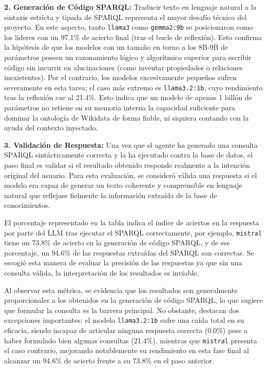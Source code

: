 \textbf{2. Generación de Código SPARQL:} Traducir texto en lenguaje natural a la sintaxis estricta y tipada de SPARQL representa el mayor desafío técnico del proyecto. En este aspecto, tanto \texttt{llama3} como \texttt{gemma2:9b} se posicionaron como los líderes con un 97.1\% de acierto final (tras el bucle de reflexión). Esto confirma la hipótesis de que los modelos con un tamaño en torno a los 8B-9B de parámetros poseen un razonamiento lógico y algorítmico superior para escribir código sin incurrir en alucinaciones (como inventar propiedades o relaciones inexistentes). Por el contrario, los modelos excesivamente pequeños sufren severamente en esta tarea; el caso más extremo es \texttt{llama3.2:1b}, cuyo rendimiento tras la reflexión cae al 21.4\%. Esto indica que un modelo de apenas 1 billón de parámetros no retiene en su memoria interna la capacidad suficiente para dominar la ontología de Wikidata de forma fiable, ni siquiera contando con la ayuda del contexto inyectado.

\textbf{3. Validación de Respuesta:} Una vez que el agente ha generado una consulta SPARQL sintácticamente correcta y la ha ejecutado contra la base de datos, el paso final es validar si el resultado obtenido responde realmente a la intención original del usuario. Para esta evaluación, se consideró válida una respuesta si el modelo era capaz de generar un texto coherente y comprensible en lenguaje natural que reflejase fielmente la información extraída de la base de conocimientos.

El porcentaje representado en la tabla indica el índice de aciertos en la respuesta por parte del LLM tras ejecutar el SPARQL correctamente, por ejemplo, \texttt{mistral} tiene un 73.8\% de acierto en la generación de código SPARQL, y de ese porcentaje, un 94.6\% de las respuestas extraídas del SPARQL son correctas. Se escogió esta manera de evaluar la precisión de las respuestas ya que sin una consulta válida, la interpretación de los resultados es inviable.

Al observar esta métrica, se evidencia que los resultados son generalmente proporcionales a los obtenidos en la generación de código SPARQL, lo que sugiere que formular la consulta es la barrera principal. No obstante, destacan dos excepciones importantes: el modelo \texttt{llama3.2:1b} sufre una caída total en su eficacia, siendo incapaz de articular ninguna respuesta correcta (0.0\%) pese a haber formulado bien algunas consultas (21.4\%), mientras que \texttt{mistral} presenta el caso contrario, mejorando notablemente su rendimiento en esta fase final al alcanzar un 94.6\% de acierto frente a su 73.8\% en el paso anterior.


